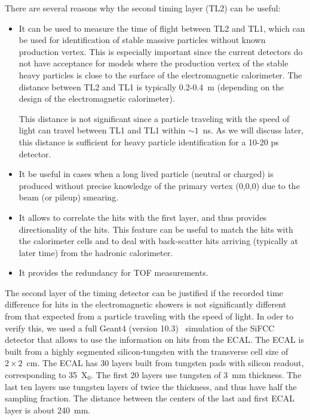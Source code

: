 \documentclass[final,1p,11pt]{elsarticle}
\begin{document}
There are several reasons why the second timing layer (TL2) can be useful:

\begin{itemize}

\item
It can be used to measure the time of flight between TL2 and TL1, which can be used for identification
of stable massive particles without known production vertex. This is especially important
since the current detectors do not have acceptance for models where the production vertex of the stable heavy particles
is close to the surface of the electromagnetic calorimeter.     
The distance between TL2 and TL1 is typically 0.2-0.4~m (depending on the design of the electromagnetic calorimeter).

This distance is not significant since a particle traveling with the speed of light can travel between TL1 and TL1 within $\sim 1$~ns. 
As we will discuss later, this distance is sufficient for heavy particle identification for a 10-20 ps detector. 


\item
It be useful in cases when a long lived particle (neutral or charged) is produced without precise knowledge of the primary vertex (0,0,0)
due to the beam (or pileup) smearing. 

\item
It allows to correlate the hits with the first layer, and thus provides directionality of the hits. This feature can be useful to
match the hits with the calorimeter cells and to deal with back-scatter 
hits arriving (typically at later time) from the hadronic calorimeter. 

\item
It provides the redundancy for TOF measurements.

\end{itemize}



The second layer of the timing detector can be justified if the recorded time difference for 
hits in the electromagnetic showers is not significantly different from that expected from a particle traveling with the speed of light.
In oder to verify this, we used a full Geant4 (version 10.3)~\cite{Allison2016186} simulation 
of the SiFCC detector \cite{Chekanov:2016ppq} that allows to use the information on hits from the ECAL.
The ECAL is built from a highly segmented silicon-tungsten  with the transverse cell size of $2 \times 2$~cm.
The ECAL has 30 layers built from tungsten pads with silicon readout,
corresponding to 35~X$_{0}$. The first 20 layers use tungsten of 3~mm thickness.
The last ten layers use tungsten layers of
twice the thickness, and thus have half the  sampling fraction.  
The distance between the centers of the last and first ECAL layer is about 240~mm.  
\end{document}
